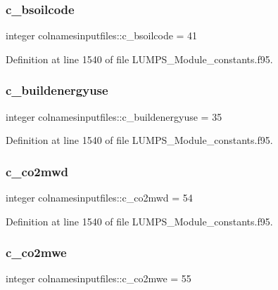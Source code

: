 \subsubsection{\texorpdfstring{c\+\_\+bsoilcode}{c\_bsoilcode}}
{\footnotesize\ttfamily integer colnamesinputfiles\+::c\+\_\+bsoilcode = 41}



Definition at line 1540 of file L\+U\+M\+P\+S\+\_\+\+Module\+\_\+constants.\+f95.

\mbox{\label{namespacecolnamesinputfiles_a811f7d78ee35342f1708073383f4da17}} 
\subsubsection{\texorpdfstring{c\+\_\+buildenergyuse}{c\_buildenergyuse}}
{\footnotesize\ttfamily integer colnamesinputfiles\+::c\+\_\+buildenergyuse = 35}



Definition at line 1540 of file L\+U\+M\+P\+S\+\_\+\+Module\+\_\+constants.\+f95.

\mbox{\label{namespacecolnamesinputfiles_a458ceb8fda92721080e551c95622d355}} 
\subsubsection{\texorpdfstring{c\+\_\+co2mwd}{c\_co2mwd}}
{\footnotesize\ttfamily integer colnamesinputfiles\+::c\+\_\+co2mwd = 54}



Definition at line 1540 of file L\+U\+M\+P\+S\+\_\+\+Module\+\_\+constants.\+f95.

\mbox{\label{namespacecolnamesinputfiles_aab9a964f8a068c45d8e4eb0bde1733ca}} 
\subsubsection{\texorpdfstring{c\+\_\+co2mwe}{c\_co2mwe}}
{\footnotesize\ttfamily integer colnamesinputfiles\+::c\+\_\+co2mwe = 55}



